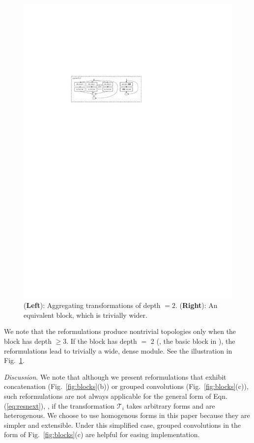 \documentclass[10pt,twocolumn,letterpaper]{article}
\begin{document}
\begin{figure}[t]
\centering
\includegraphics[width=1.0\linewidth]{figures/blocks/blocks-2layer}
\caption{(\textbf{Left}): Aggregating transformations of depth $= 2$. (\textbf{Right}): An equivalent block, which is trivially wider.}
\label{fig:2layer}
\end{figure}

We note that the reformulations produce nontrivial topologies only when the block has depth $\geq$3. If the block has depth $=$ 2 (\eg, the basic block in \cite{He2016}), the reformulations lead to trivially a wide, dense module. See the illustration in Fig.~\ref{fig:2layer}.

\vspace{.5em}
\noindent\emph{Discussion}. We note that although we present reformulations that exhibit concatenation (Fig.~\ref{fig:blocks}(b)) or grouped convolutions (Fig.~\ref{fig:blocks}(c)), such reformulations are not always applicable for the general form of Eqn.(\ref{eq:resnext}), \eg, if the transformation $\mathcal{T}_i$ takes arbitrary forms and are heterogenous.
We choose to use homogenous forms in this paper because they are simpler and extensible. Under this simplified case, grouped convolutions in the form of Fig.~\ref{fig:blocks}(c) are helpful for easing implementation.
\end{document}
